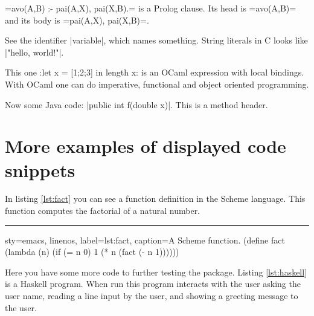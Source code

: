 \documentclass[10pt,a4paper]{article}
\begin{document}
\begin{Example}
\pyginline[lang=prolog,colback=yellow]=avo(A,B) :- pai(A,X), pai(X,B).=
is a Prolog clause. Its head is
\pyginline[lang=prolog,sty=emacs,colback=yellow,linecolor=red]=avo(A,B)=
and its body is
\pyginline[lang=prolog,sty=vim,colback=black,hidealllines]=pai(A,X), pai(X,B)=.
\end{Example}

\begin{Example}
See the identifier \pyginline[inline method=efbox,colback=green!25]|variable|,
which names something. String literals in C looks like
\pyginline[lang=c,inline method=tcbox,colback=blue!20,boxrule=2pt]|"hello, world!\n"|.
\end{Example}


\begin{Example}
This one
\pyginline[lang=ocaml,font=\ttfamily\scriptsize,topline=false]:let x = [1;2;3] in length x:
is an OCaml expression with local bindings. With OCaml one can do
imperative, functional and object oriented programming.
\end{Example}

\begin{Example}
Now some Java code:
\pyginline[lang=java,sty=colorful,font=\ttfamily\itshape,linewidth=1pt]|public int f(double x)|.
This is a method header.
\end{Example}

\section{More examples of displayed code snippets}


In listing \ref{lst:fact} you can see a function definition in the
Scheme language. This function computes the factorial of a natural
number.
\newline\rule{\linewidth}{2pt}
\begin{pygmented}{sty=emacs,
linenos,
label=lst:fact,
caption=A Scheme function.
}
(define fact
(lambda (n)
(if (= n 0)
1
(* n (fact (- n 1))))))
\end{pygmented}

Here you have some more code to further testing the package. Listing
\ref{lst:haskell} is a Haskell program. When run this program interacts
with the user asking the user name, reading a line input by the user,
and showing a greeting message to the user.
\end{document}
